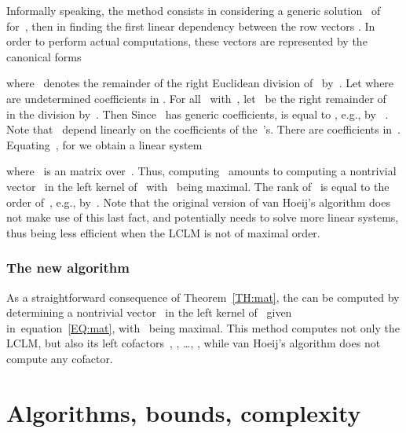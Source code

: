 \documentclass{sig-alt-full}
\begin{document}
Informally speaking, the method consists in considering a generic solution~ of~ for~, then in finding the first linear dependency between the row vectors .
In order to perform actual computations, these vectors are represented by the canonical forms

where ~denotes the remainder of the right Euclidean division of~ by~.
Let 
where~ are undetermined coefficients in .
For all~ with~, let~ be the right remainder
of~ in the division by~. Then 
Since~ has generic coefficients,   is equal to , e.g., by ~\cite[Lemma~2.3]{Li98}.
Note that~ depend linearly on the coefficients of the~'s.
There are  coefficients in~.
Equating~, for   we obtain a linear system

where~ is an  matrix over~. Thus, computing~
amounts to computing a nontrivial vector~ in the left kernel of~ with~ being maximal.
The rank of~ is equal to the order of~,
e.g., by~\cite[Proposition~4.3]{AbLeLi05}. Note that the original version of van Hoeij's algorithm does not make use of this last fact, and potentially needs to solve more linear systems, thus being less efficient when the LCLM is not of maximal order. 

\subsubsection{The new algorithm}
As a straightforward consequence of Theorem~\ref{TH:mat}, the  can be computed
by determining a nontrivial vector~ in the left kernel of~ given in~equation~\eqref{EQ:mat},
with~ being maximal. This method computes not only the LCLM, but also its left cofactors~,
, \ldots, , while van Hoeij's algorithm does not
compute any cofactor.

\section{\!\!\!\!\!\! Algorithms, bounds, complexity} \label{sec:ABC}
\end{document}
